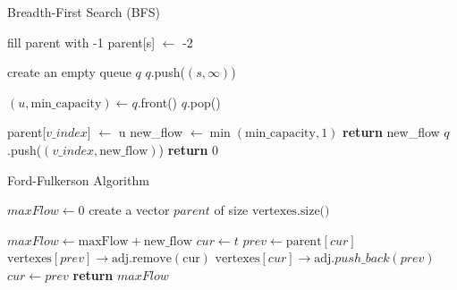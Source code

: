 \documentclass{article}
\begin{document}
\begin{algorithm}
\caption{Breadth-First Search (BFS)}\label{bfs}
\begin{algorithmic}[1]
    \State fill parent with -1 
    \State parent[s] $\gets$ -2 

    \State create an empty queue $q$
    \State $q$.push($(s, \infty)$) 

        \State $(u, \text{min\_capacity}) \gets q$.front()
        \State $q$.pop()

               

                \State parent[$v\_index$] $\gets$ u
                \State new\_flow $\gets \min(\text{min\_capacity}, 1)$
                    \State \textbf{return} new\_flow
                \EndIf
                \State $q$.push($(v\_index, \text{new\_flow})$)
            \EndIf
        \EndFor
    \EndWhile
    \State \textbf{return} 0
\EndFunction
\end{algorithmic}
\end{algorithm}


\begin{algorithm}
\caption{Ford-Fulkerson Algorithm}\label{fordfulkerson}
\begin{algorithmic}[1]
    \State $maxFlow \gets 0$
    \State create a vector $parent$ of size $\text{vertexes.size()}$

        \State $maxFlow \gets \text{maxFlow} + \text{new\_flow}$
        \State $cur \gets t$
            \State $prev \gets \text{parent}[cur]$
            \State $\text{vertexes}[prev]\rightarrow\text{adj}.\text{remove}(\text{cur})$
            \State $\text{vertexes}[cur]\rightarrow\text{adj}.push\_back(prev)$
            \State $cur \gets prev$
        \EndWhile
    \EndWhile
    \State \textbf{return} $maxFlow$
\EndFunction
\end{algorithmic}
\end{algorithm}
\end{document}
